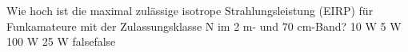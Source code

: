    {Wie hoch ist die maximal zulässige isotrope Strahlungsleistung (EIRP) für Funkamateure mit der Zulassungsklasse N im 2 m- und 70 cm-Band?}
    {10 W}
    {5 W}
    {100 W}
    {25 W}
    {false}{false}